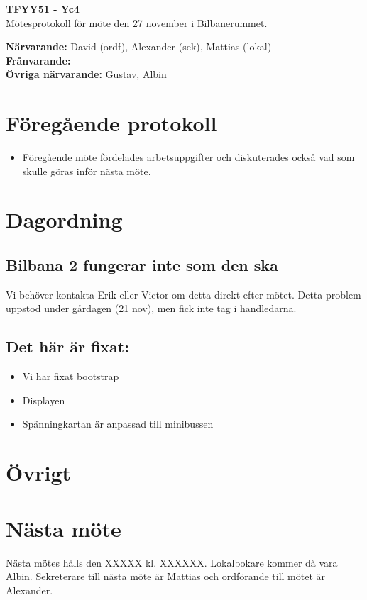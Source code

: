 \documentclass[11pt,a4paper]{article}
\begin{document}
    \begin{center}
        \textbf{\Large TFYY51 - Yc4} \\[0.2em]
        Mötesprotokoll för möte den 27 november i Bilbanerummet.
    \end{center}
    \vspace{1em}
    \textbf{Närvarande:} David (ordf), Alexander (sek), Mattias (lokal) \\[0.5em]
    \textbf{Frånvarande:}  \\[0.5em]  %
    \textbf{Övriga närvarande: }Gustav, Albin

    \section*{Föregående protokoll}
    \begin{itemize}
        \item Föregående möte fördelades arbetsuppgifter och diskuterades också vad som skulle göras inför nästa möte.\
    \end{itemize}

    \section*{Dagordning}
    \subsection*{Bilbana 2 fungerar inte som den ska}
	    Vi behöver kontakta Erik eller Victor om detta direkt efter mötet. Detta problem uppstod under gårdagen (21 nov), men fick inte tag i handledarna.
	    \subsection*{Det här är fixat:}
	     
	    \begin{itemize}
	    	\item Vi har fixat bootstrap
	    	\item Displayen
	    	\item Spänningkartan är anpassad till minibussen
	    \end{itemize}
    \section*{Övrigt}
    

    \section*{Nästa möte}
    Nästa mötes hålls den XXXXX kl. XXXXXX. Lokalbokare kommer då vara Albin. Sekreterare till nästa möte är Mattias och ordförande till mötet är Alexander.  
\end{document}
